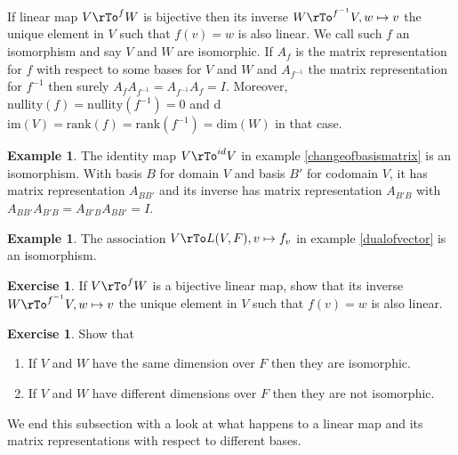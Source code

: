 \documentclass[12pt]{amsart}
\theoremstyle{definition}
\newtheorem{example}[theorem]{Example}
\newtheorem{exercise}[theorem]{Exercise}
\begin{document}
If linear map $V \rTo^f W$ is bijective then its inverse $W \rTo^{f^{-1}} V, w \mapsto v$ the unique element in $V$ such that $f(v) = w$ is also linear. We call such $f$ an isomorphism and say $V$ and $W$ are isomorphic. If $A_f$ is the matrix representation for $f$ with respect to some bases for $V$ and $W$ and $A_{f^{-1}}$ the matrix representation for $f^{-1}$ then surely $A_f A_{f^{-1}} = A_{f^{-1}} A_f = I$. Moreover, $\text{nullity}(f) = \text{nullity}(f^{-1}) = 0$ and d$\text{im}(V) = \text{rank}(f) = \text{rank}(f^{-1}) = \text{dim}(W)$ in that case.

\begin{example}\label{} The identity map $V \rTo^{id} V$ in example \ref{changeofbasismatrix} is an isomorphism. With basis $B$ for domain $V$ and basis $B'$ for codomain $V$, it has matrix representation $A_{BB'}$ and its inverse has matrix representation $A_{B'B}$ with $A_{BB'} A_{B'B} = A_{B'B} A_{BB'} = I$.
\end{example}

\begin{example}\label{} The association $V \rTo L(V,F), v \mapsto f_v$ in example \ref{dualofvector} is an isomorphism.
\end{example}

\begin{exercise}\label{} If $V \rTo^f W$ is a bijective linear map, show that its inverse $W \rTo^{f^{-1}} V, w \mapsto v$ the unique element in $V$ such that $f(v) = w$ is also linear.
\end{exercise}

\begin{exercise}\label{} Show that
\begin{enumerate}[\indent a.]
\item If $V$ and $W$ have the same dimension over $F$ then they are isomorphic.
\item If $V$ and $W$ have different dimensions over $F$ then they are not isomorphic.
\end{enumerate}
\end{exercise}

We end this subsection with a look at what happens to a linear map and its matrix representations with respect to different bases.
\end{document}

